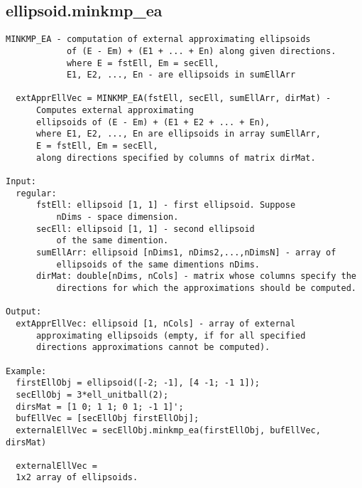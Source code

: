 \subsection{\texorpdfstring{ellipsoid.minkmp\_ea}{minkmp\_ea}}\label{method:ellipsoid.minkmpea}
\begin{verbatim}
MINKMP_EA - computation of external approximating ellipsoids
            of (E - Em) + (E1 + ... + En) along given directions.
            where E = fstEll, Em = secEll,
            E1, E2, ..., En - are ellipsoids in sumEllArr

  extApprEllVec = MINKMP_EA(fstEll, secEll, sumEllArr, dirMat) -
      Computes external approximating
      ellipsoids of (E - Em) + (E1 + E2 + ... + En),
      where E1, E2, ..., En are ellipsoids in array sumEllArr,
      E = fstEll, Em = secEll,
      along directions specified by columns of matrix dirMat.

Input:
  regular:
      fstEll: ellipsoid [1, 1] - first ellipsoid. Suppose
          nDims - space dimension.
      secEll: ellipsoid [1, 1] - second ellipsoid
          of the same dimention.
      sumEllArr: ellipsoid [nDims1, nDims2,...,nDimsN] - array of
          ellipsoids of the same dimentions nDims.
      dirMat: double[nDims, nCols] - matrix whose columns specify the
          directions for which the approximations should be computed.

Output:
  extApprEllVec: ellipsoid [1, nCols] - array of external
      approximating ellipsoids (empty, if for all specified
      directions approximations cannot be computed).

Example:
  firstEllObj = ellipsoid([-2; -1], [4 -1; -1 1]);
  secEllObj = 3*ell_unitball(2);
  dirsMat = [1 0; 1 1; 0 1; -1 1]';
  bufEllVec = [secEllObj firstEllObj];
  externalEllVec = secEllObj.minkmp_ea(firstEllObj, bufEllVec, dirsMat)

  externalEllVec =
  1x2 array of ellipsoids.
\end{verbatim}
